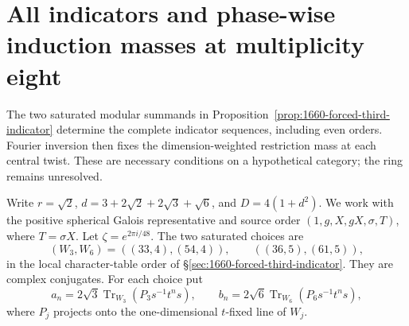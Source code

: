 \section{All indicators and phase-wise induction masses at multiplicity eight}
\label{sec:1660-all-indicators-phase-masses}

The two saturated modular summands in
Proposition~\ref{prop:1660-forced-third-indicator} determine the complete
indicator sequences, including even orders. Fourier inversion then fixes
the dimension-weighted restriction mass at each central twist. These are
necessary conditions on a hypothetical category; the ring remains
unresolved.

Write $r=\sqrt2$, $d=3+2\sqrt2+2\sqrt3+\sqrt6$, and
$D=4(1+d^2)$. We work with the positive spherical Galois representative
and source order $(1,g,X,gX,\sigma,T)$, where $T=\sigma X$.
Let $\zeta=e^{2\pi i/48}$. The two saturated choices are
\[
 (W_3,W_6)=((33,4),(54,4)),\qquad
 ((36,5),(61,5)),
\]
in the local character-table order of
\S\ref{sec:1660-forced-third-indicator}. They are complex conjugates.
For each choice put
\[
 a_n=2\sqrt3\operatorname{Tr}_{W_3}(P_3s^{-1}t^ns),\qquad
 b_n=2\sqrt6\operatorname{Tr}_{W_6}(P_6s^{-1}t^ns),
\]
where $P_j$ projects onto the one-dimensional $t$-fixed line of $W_j$.

